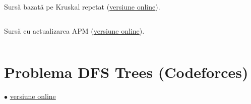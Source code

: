 \documentclass[../main.tex]{subfiles}
\begin{document}
Sursă bazată pe Kruskal repetat (\href{https://codeforces.com/contest/76/submission/364016227}{versiune online}).

\inputminted{cpp}{../src/graphs/gift-kruskal.cpp}

Sursă cu actualizarea APM (\href{https://codeforces.com/contest/76/submission/364031639}{versiune online}).

\inputminted{cpp}{../src/graphs/gift-updated-mst.cpp}

\section{Problema DFS Trees (Codeforces)}
\label{code:dfs-trees}
$\bullet$
\href{https://codeforces.com/contest/1707/submission/363696429}{versiune online}

\inputminted{cpp}{../src/graphs/dfs-trees.cpp}
\end{document}
